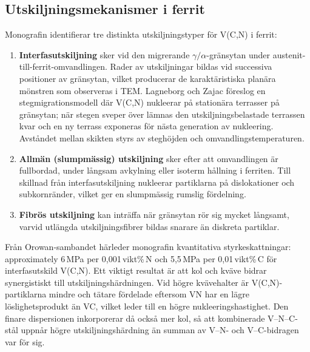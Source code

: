 \documentclass[11pt,a4paper]{article}
\begin{document}
\subsection{Utskiljningsmekanismer i ferrit}

Monografin identifierar tre distinkta utskiljningstyper f\"or V(C,N) i
ferrit:

\begin{enumerate}
  \item \textbf{Interfasutskiljning} sker vid den migrerande
    $\gamma/\alpha$-gr\"ansytan under austenit-till-ferrit-omvandlingen.
    Rader av utskiljningar bildas vid successiva positioner av
    gr\"ansytan, vilket producerar de karakt\"aristiska plan\"ara
    m\"onstren som observeras i TEM.  Lagneborg och Zajac
    \cite{LagneborgZajac2001} f\"oreslog en stegmigrationsmodell d\"ar
    V(C,N) nukleerar p\aa{} station\"ara terrasser p\aa{} gr\"ansytan;
    n\"ar stegen sveper \"over l\"amnas den utskiljningsbelastade
    terrassen kvar och en ny terrass exponeras f\"or n\"asta generation
    av nukleering.  Avståndet mellan skikten styrs av stegh\"ojden och
    omvandlingstemperaturen.

  \item \textbf{Allm\"an (slumpm\"assig) utskiljning} sker efter att
    omvandlingen \"ar fullbordad, under l\aa{}ngsam avkylning eller
    isoterm h\aa{}llning i ferriten.  Till skillnad fr\aa{}n
    interfasutskiljning nukleerar partiklarna p\aa{} dislokationer och
    subkornr\"ander, vilket ger en slumpm\"assig rumslig f\"ordelning.

  \item \textbf{Fibr\"os utskiljning} kan intr\"affa n\"ar gr\"ansytan
    r\"or sig mycket l\aa{}ngsamt, varvid utl\"angda
    utskiljningsfibrer bildas snarare \"an diskreta partiklar.
\end{enumerate}

Fr\aa{}n Orowan-sambandet h\"arleder monografin kvantitativa
styrkeskattningar: approximately 6\,MPa per 0,001\,vikt\%\,N och
5,5\,MPa per 0,01\,vikt\%\,C f\"or interfasutskild V(C,N).  Ett
viktigt resultat \"ar att kol och kv\"ave bidrar synergistiskt till
utskiljningsh\"ardningen.  Vid h\"ogre kv\"avehalter \"ar
V(C,N)-partiklarna mindre och t\"atare f\"ordelade eftersom VN har en
l\"agre l\"oslighetsprodukt \"an VC, vilket leder till en h\"ogre
nukleeringshastighet.  Den finare dispersionen inkorporerar d\aa{} ocks\aa{}
mer kol, s\aa{} att kombinerade V--N--C-st\aa{}l uppn\aa{}r h\"ogre
utskiljningsh\"ardning \"an summan av V--N- och V--C-bidragen var f\"or
sig.
\end{document}
